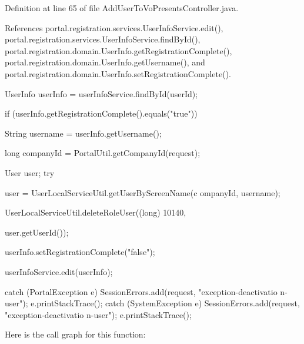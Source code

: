 Definition at line 65 of file AddUserToVoPresentsController.java.



References portal.registration.services.UserInfoService.edit(), portal.registration.services.UserInfoService.findById(), portal.registration.domain.UserInfo.getRegistrationComplete(), portal.registration.domain.UserInfo.getUsername(), and portal.registration.domain.UserInfo.setRegistrationComplete().


\begin{DoxyCode}
                                                                       {

                UserInfo userInfo = userInfoService.findById(userId);

                if (userInfo.getRegistrationComplete().equals("true")) {
                        String username = userInfo.getUsername();

                        long companyId = PortalUtil.getCompanyId(request);

                        User user;
                        try {
                                user = UserLocalServiceUtil.getUserByScreenName(c
      ompanyId,
                                                username);

                                UserLocalServiceUtil.deleteRoleUser((long) 10140,
      
                                                user.getUserId());

                                userInfo.setRegistrationComplete("false");

                                userInfoService.edit(userInfo);

                        } catch (PortalException e) {
                                SessionErrors.add(request, "exception-deactivatio
      n-user");
                                e.printStackTrace();
                        } catch (SystemException e) {
                                SessionErrors.add(request, "exception-deactivatio
      n-user");
                                e.printStackTrace();
                        }
                }

        }
\end{DoxyCode}


Here is the call graph for this function:


